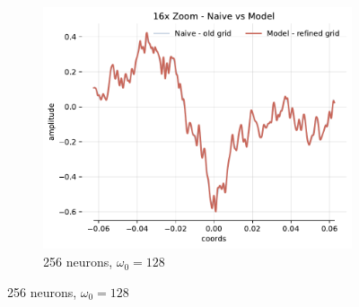 \begin{figure}[h]
\begin{subfigure}[b]{0.32\textwidth}
    \end{subfigure}
    \begin{subfigure}[b]{0.32\textwidth}
        \centering
        \includegraphics[width=\textwidth]{img/ch3/16x-zoom-1hl-256hf-128hz.pdf}
        \caption{256 neurons, $\omega_0=128$}
        \label{fig:16x-zoom-1hl-256hf-128hz}
    \end{subfigure}


\end{figure}
